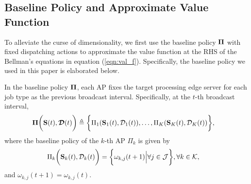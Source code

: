 \subsection{Baseline Policy and Approximate Value Function}
\label{subsec:baseline}
To alleviate the curse of dimensionality, we first use the baseline policy $\boldsymbol{\Pi}$ with fixed dispatching actions to approximate the value function at the RHS of the Bellman's equations in equation (\ref{eqn:val_f}).
Specifically, the baseline policy we used in this paper is elaborated below.

\begin{definition}
    In the baseline policy $\boldsymbol{\Pi}$, each AP fixes the target processing edge server for each job type as the previous broadcast interval. Specifically, at the $t$-th broadcast interval,
    {\small
    \begin{align}
        \boldsymbol{\Pi}\bigg(\mathbf{S}(t),\boldsymbol{\mathcal{D}}(t)\bigg) &\triangleq \bigg\{ 
            \Pi_{1}(\mathbf{S}_{1}(t),\mathcal{D}_{1}(t)),
            \dots,
            \Pi_{K}(\mathbf{S}_{K}(t),\mathcal{D}_{K}(t))
        \bigg\},
    \end{align}
    }%
    where the baseline policy of the $k$-th AP $\Pi_k$ is given by 
    {\small
    \begin{align}
        \Pi_{k}\bigg(\mathbf{S}_{k}(t),\mathcal{D}_{k}(t)\bigg)
        &= \bigg\{
            {\omega}_{k,j}(t+1) \Big| \forall j\in\mathcal{J}
        \bigg\}, \forall k\in\mathcal{K},
    \end{align}
    }%
    and $\omega_{k,j}(t+1) = \omega_{k,j}(t)$.
\end{definition}

%

